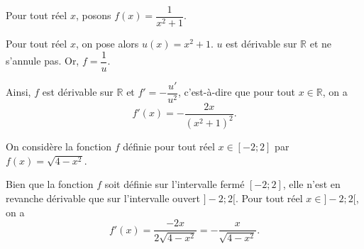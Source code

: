 \documentclass[11pt,fleqn, openany]{book} %
\begin{document}
\begin{example}Pour tout réel $x$, posons $f(x)=\dfrac{1}{x^2+1}$. 

Pour tout réel $x$, on pose alors $u(x)=x^2+1$. $u$ est dérivable sur $\mathbb{R}$ et ne s'annule pas. Or, $f=\dfrac{1}{u}$.

 Ainsi, $f$ est dérivable sur $\mathbb{R}$ et $f'=-\dfrac{u'}{u^2}$, c'est-à-dire que pour tout $x\in \mathbb{R}$, on a
\[ f'(x)=- \dfrac{2x}{(x^2+1)^2}.\]\end{example}

\begin{example}On considère la fonction $f$ définie pour tout réel $x\in[-2;2]$ par $f(x)=\sqrt{4-x^2}$.

Bien que la fonction $f$ soit définie sur l'intervalle fermé $[-2;2]$, elle n'est en revanche dérivable que sur l'intervalle ouvert $]-2;2[$. Pour tout réel $x\in]-2;2[$, on a
\[f'(x)=\dfrac{-2x}{2\sqrt{4-x^2}}=-\dfrac{x}{\sqrt{4-x^2}}.\]\end{example}
\end{document}
